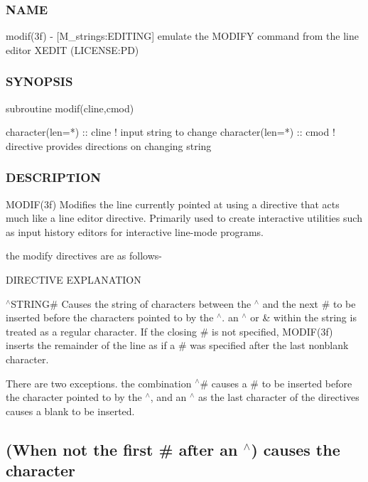 \subsubsection*{N\+A\+ME}

modif(3f) -\/ \mbox{[}M\+\_\+strings\+:E\+D\+I\+T\+I\+NG\mbox{]} emulate the M\+O\+D\+I\+FY command from the line editor X\+E\+D\+IT (L\+I\+C\+E\+N\+SE\+:PD) 

\subsubsection*{S\+Y\+N\+O\+P\+S\+IS}

\begin{DoxyVerb}subroutine modif(cline,cmod)

 character(len=*) :: cline ! input string to change
 character(len=*) :: cmod  ! directive provides directions on changing string
\end{DoxyVerb}
 \subsubsection*{D\+E\+S\+C\+R\+I\+P\+T\+I\+ON}

M\+O\+D\+I\+F(3f) Modifies the line currently pointed at using a directive that acts much like a line editor directive. Primarily used to create interactive utilities such as input history editors for interactive line-\/mode programs.

the modify directives are as follows-\/

D\+I\+R\+E\+C\+T\+I\+VE E\+X\+P\+L\+A\+N\+A\+T\+I\+ON

$^\wedge$\+S\+T\+R\+I\+NG\# Causes the string of characters between the $^\wedge$ and the next \# to be inserted before the characters pointed to by the $^\wedge$. an $^\wedge$ or \& within the string is treated as a regular character. If the closing \# is not specified, M\+O\+D\+I\+F(3f) inserts the remainder of the line as if a \# was specified after the last nonblank character.

There are two exceptions. the combination $^\wedge$\# causes a \# to be inserted before the character pointed to by the $^\wedge$, and an $^\wedge$ as the last character of the directives causes a blank to be inserted.

\subsection*{(When not the first \# after an $^\wedge$) causes the character}

